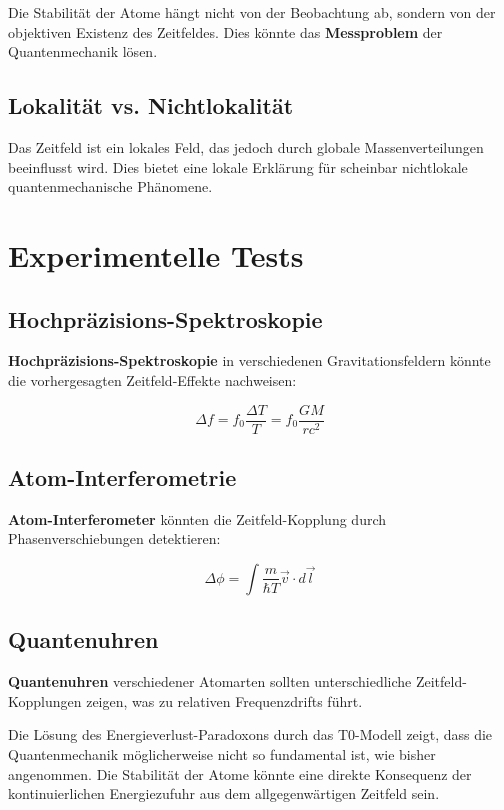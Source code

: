 \documentclass[12pt,a4paper]{report}
\begin{document}
	Die Stabilität der Atome hängt nicht von der Beobachtung ab, sondern von der objektiven Existenz des Zeitfeldes. Dies könnte das \textbf{Messproblem} der Quantenmechanik lösen.
	
	\subsection{Lokalität vs. Nichtlokalität}
	
	Das Zeitfeld ist ein lokales Feld, das jedoch durch globale Massenverteilungen beeinflusst wird. Dies bietet eine lokale Erklärung für scheinbar nichtlokale quantenmechanische Phänomene.
	
	\section{Experimentelle Tests}
	
	\subsection{Hochpräzisions-Spektroskopie}
	
	\textbf{Hochpräzisions-Spektroskopie} in verschiedenen Gravitationsfeldern könnte die vorhergesagten Zeitfeld-Effekte nachweisen:
	
	\begin{equation}
		\Delta f = f_0 \frac{\Delta T}{T} = f_0 \frac{GM}{rc^2}
	\end{equation}
	
	\subsection{Atom-Interferometrie}
	
	\textbf{Atom-Interferometer} könnten die Zeitfeld-Kopplung durch Phasenverschiebungen detektieren:
	
	\begin{equation}
		\Delta\phi = \int \frac{m}{\hbar T} \vec{v} \cdot d\vec{l}
	\end{equation}
	
	\subsection{Quantenuhren}
	
	\textbf{Quantenuhren} verschiedener Atomarten sollten unterschiedliche Zeitfeld-Kopplungen zeigen, was zu relativen Frequenzdrifts führt.
	
	Die Lösung des Energieverlust-Paradoxons durch das T0-Modell zeigt, dass die Quantenmechanik möglicherweise nicht so fundamental ist, wie bisher angenommen. Die Stabilität der Atome könnte eine direkte Konsequenz der kontinuierlichen Energiezufuhr aus dem allgegenwärtigen Zeitfeld sein.
\end{document}
